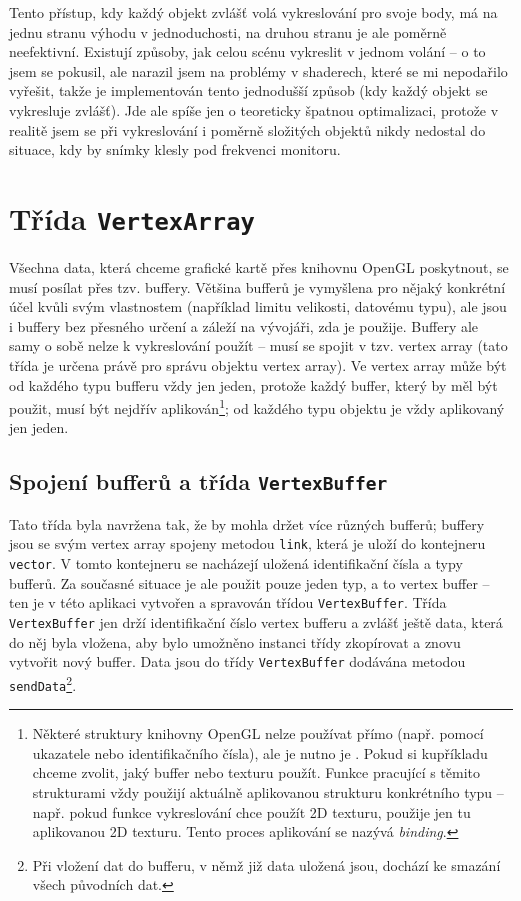 \documentclass[a4paper, 11pt]{report}
\begin{document}
Tento přístup, kdy každý objekt zvlášť volá vykreslování pro svoje body, má na jednu stranu výhodu v jednoduchosti, na druhou stranu je ale poměrně neefektivní. Existují způsoby, jak celou scénu vykreslit v jednom volání -- o to jsem se pokusil, ale narazil jsem na problémy v shaderech, které se mi nepodařilo vyřešit, takže je implementován tento jednodušší způsob (kdy každý objekt se vykresluje zvlášť). Jde ale spíše jen o teoreticky špatnou optimalizaci, protože v realitě jsem se při vykreslování i poměrně složitých objektů nikdy nedostal do situace, kdy by snímky klesly pod frekvenci monitoru.

\section{Třída \texttt{VertexArray}}
Všechna data, která chceme grafické kartě přes knihovnu OpenGL poskytnout, se musí posílat přes tzv. buffery. Většina bufferů je vymyšlena pro nějaký konkrétní účel kvůli svým vlastnostem (například limitu velikosti, datovému typu), ale jsou i buffery bez přesného určení a záleží na vývojáři, zda je použije. Buffery ale samy o sobě nelze k vykreslování použít -- musí se spojit v tzv. vertex array (tato třída je určena právě pro správu objektu vertex array). Ve vertex array může být od každého typu bufferu vždy jen jeden, protože každý buffer, který by měl být použit, musí být nejdřív aplikován\footnote{Některé struktury knihovny OpenGL nelze používat přímo (např. pomocí ukazatele nebo identifikačního čísla), ale je nutno je . Pokud si kupříkladu chceme zvolit, jaký buffer nebo texturu použít. Funkce pracující s těmito strukturami vždy použijí aktuálně aplikovanou strukturu konkrétního typu -- např. pokud funkce vykreslování chce použít 2D texturu, použije jen tu aplikovanou 2D texturu. Tento proces aplikování se nazývá \emph{binding}.}; od každého typu objektu je vždy aplikovaný jen jeden.

\subsection{Spojení bufferů a třída \texttt{VertexBuffer}}
Tato třída byla navržena tak, že by mohla držet více různých bufferů; buffery jsou se svým vertex array spojeny metodou \texttt{link}, která je uloží do kontejneru \texttt{vector}. V tomto kontejneru se nacházejí uložená identifikační čísla a typy bufferů. Za současné situace je ale použit pouze jeden typ, a to vertex buffer -- ten je v této aplikaci vytvořen a spravován třídou \texttt{VertexBuffer}. Třída \texttt{VertexBuffer} jen drží identifikační číslo vertex bufferu a zvlášť ještě data, která do něj byla vložena, aby bylo umožněno instanci třídy zkopírovat a znovu vytvořit nový buffer. Data jsou do třídy \texttt{VertexBuffer} dodávána metodou \texttt{sendData}\footnote{Při vložení dat do bufferu, v němž již data uložená jsou, dochází ke smazání všech původních dat.}.
\end{document}
